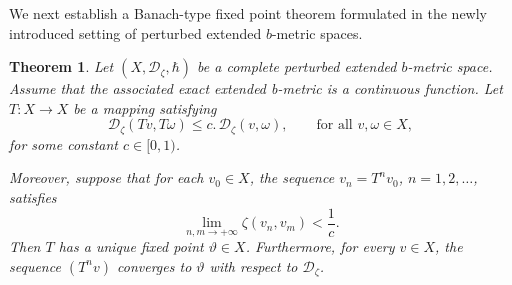 \documentclass[sn-mathphys-num]{sn-jnl}%
\theoremstyle{thmstyleone}%
\newtheorem{theorem}{Theorem}%
\theoremstyle{thmstyletwo}%
\theoremstyle{thmstylethree}%
\numberwithin{equation}{section}
\begin{document}
We next establish a Banach-type fixed point theorem formulated in the newly introduced setting of perturbed extended $b$-metric spaces.

\vspace{0.3cm}

\begin{theorem}\label{3.1} 
Let $(X,\mathcal{D}_{\zeta},\hbar)$ be a complete perturbed extended $b$-metric space. Assume that the associated exact extended b-metric is a continuous function. Let $T : X \to X$ be a mapping satisfying
\begin{equation}
\mathcal{D}_{\zeta}(T v,T \omega) 
\le c.\, \mathcal{D}_{\zeta}(v,\omega),
\qquad \text{for all } v,\omega \in X,
\end{equation}
for some constant $c \in [0,1)$. 

Moreover, suppose that for each $v_{0} \in X$, the sequence 
$v_{n} = T^{n}v_{0}$, $n = 1,2,\dots$, satisfies
\[
\lim_{n,m \to +\infty} \zeta(v_{n},v_{m}) < \frac{1}{c}.
\]
Then $T$ has a unique fixed point $\vartheta \in X$. Furthermore, for every 
$v \in X$, the sequence $(T^{n}v)$ converges to $\vartheta$ with respect to $\mathcal{D}_{\zeta}$.
\end{theorem}
\end{document}
